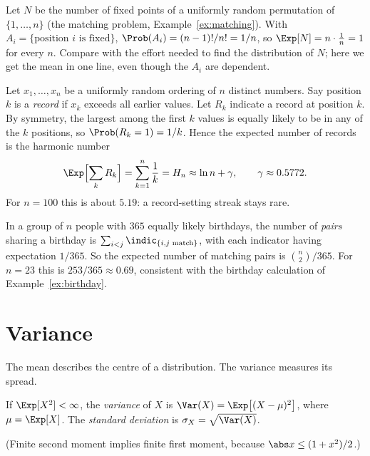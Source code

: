 \begin{example}
Let $N$ be the number of fixed points of a uniformly random permutation of
$\{1,\dots,n\}$ (the matching problem, Example~\ref{ex:matching}). With
$A_i=\{\text{position }i\text{ is fixed}\}$, $\Prob(A_i)=(n-1)!/n!=1/n$, so
$\Exp[N]=n\cdot\frac1n=1$ for every $n$. Compare with the effort needed to find
the distribution of $N$; here we get the mean in one line, even though the $A_i$
are dependent.
\end{example}

\begin{example}\label{ex:records}
Let $x_1,\dots,x_n$ be a uniformly random ordering of $n$ distinct numbers. Say
position $k$ is a \emph{record} if $x_k$ exceeds all earlier values. Let $R_k$
indicate a record at position $k$. By symmetry, the largest among the first $k$
values is equally likely to be in any of the $k$ positions, so
$\Prob(R_k=1)=1/k$. Hence the expected number of records is the harmonic number
\[
\Exp\Bigl[\sum_kR_k\Bigr]=\sum_{k=1}^n\frac1k=H_n\approx\ln n+\gamma,\qquad
\gamma\approx0.5772 .
\]
For $n=100$ this is about $5.19$: a record-setting streak stays rare.
\end{example}

\begin{example}
In a group of $n$ people with $365$ equally likely birthdays, the number of
\emph{pairs} sharing a birthday is $\sum_{i<j}\indic_{\{i,j\text{ match}\}}$, with
each indicator having expectation $1/365$. So the expected number of matching
pairs is $\binom n2/365$. For $n=23$ this is $253/365\approx0.69$, consistent with
the birthday calculation of Example~\ref{ex:birthday}.
\end{example}

\section{Variance}

The mean describes the centre of a distribution. The variance measures its
spread.

\begin{definition}[Variance]
If $\Exp[X^2]<\infty$, the \emph{variance} of $X$ is
$\Var(X)=\Exp\bigl[(X-\mu)^2\bigr]$, where $\mu=\Exp[X]$. The
\emph{standard deviation} is $\sigma_X=\sqrt{\Var(X)}$.
\end{definition}

(Finite second moment implies finite first moment, because
$\abs x\le(1+x^2)/2$.)

